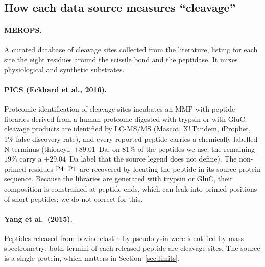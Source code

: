 \subsection{How each data source measures ``cleavage''}
\paragraph{MEROPS.} A curated database of cleavage sites collected from the literature, listing for each site the eight residues around the scissile bond and the peptidase. It mixes physiological and synthetic substrates. \paragraph{PICS (Eckhard et al., 2016).} Proteomic identification of cleavage sites incubates an MMP with peptide libraries derived from a human proteome digested with trypsin or with GluC; cleavage products are identified by LC-MS/MS (Mascot, X!\,Tandem, iProphet, 1\% false-discovery rate), and every reported peptide carries a chemically labelled N-terminus (thioacyl, $+89.01$~Da, on $81\%$ of the peptides we use; the remaining $19\%$ carry a $+29.04$~Da label that the source legend does not define). The non-primed residues $\mathrm{P}4$--$\mathrm{P}1$ are recovered by locating the peptide in its source protein sequence. Because the libraries are generated with trypsin or GluC, their composition is constrained at peptide ends, which can leak into primed positions of short peptides; we do not correct for this. \paragraph{Yang et al.\ (2015).} Peptides released from bovine elastin by pseudolysin were identified by mass spectrometry; both termini of each released peptide are cleavage sites. The source is a single protein, which matters in Section~\ref{sec:limits}.
